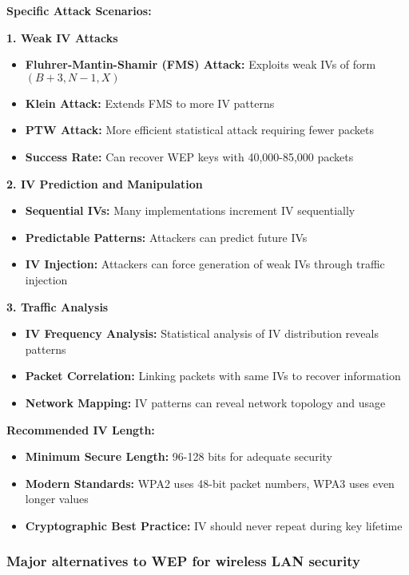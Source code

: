 \documentclass[12pt,a4paper]{article}
\begin{document}
\textbf{Specific Attack Scenarios:}

\textbf{1. Weak IV Attacks}
\begin{itemize}
    \item \textbf{Fluhrer-Mantin-Shamir (FMS) Attack:} Exploits weak IVs of form $(B+3, N-1, X)$
    \item \textbf{Klein Attack:} Extends FMS to more IV patterns
    \item \textbf{PTW Attack:} More efficient statistical attack requiring fewer packets
    \item \textbf{Success Rate:} Can recover WEP keys with 40,000-85,000 packets
\end{itemize}

\textbf{2. IV Prediction and Manipulation}
\begin{itemize}
    \item \textbf{Sequential IVs:} Many implementations increment IV sequentially
    \item \textbf{Predictable Patterns:} Attackers can predict future IVs
    \item \textbf{IV Injection:} Attackers can force generation of weak IVs through traffic injection
\end{itemize}

\textbf{3. Traffic Analysis}
\begin{itemize}
    \item \textbf{IV Frequency Analysis:} Statistical analysis of IV distribution reveals patterns
    \item \textbf{Packet Correlation:} Linking packets with same IVs to recover information
    \item \textbf{Network Mapping:} IV patterns can reveal network topology and usage
\end{itemize}

\textbf{Recommended IV Length:}
\begin{itemize}
    \item \textbf{Minimum Secure Length:} 96-128 bits for adequate security
    \item \textbf{Modern Standards:} WPA2 uses 48-bit packet numbers, WPA3 uses even longer values
    \item \textbf{Cryptographic Best Practice:} IV should never repeat during key lifetime
\end{itemize}

\subsubsection{Major alternatives to WEP for wireless LAN security}
\end{document}
